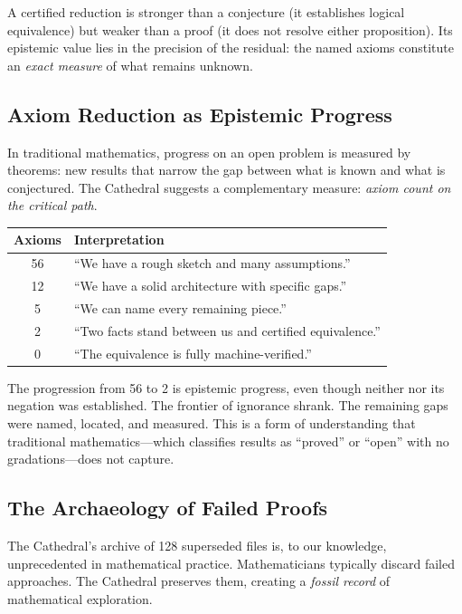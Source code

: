 \documentclass[11pt,a4paper]{article}
\begin{document}
A certified reduction is stronger than a conjecture (it establishes
logical equivalence) but weaker than a proof (it does not resolve
either proposition). Its epistemic value lies in the precision of
the residual: the named axioms constitute an \emph{exact measure}
of what remains unknown.

\subsection{Axiom Reduction as Epistemic Progress}

In traditional mathematics, progress on an open problem is measured
by theorems: new results that narrow the gap between what is known
and what is conjectured. The Cathedral suggests a complementary
measure: \emph{axiom count on the critical path}.

\begin{center}
\begin{tabular}{@{}cl@{}}
\toprule
\textbf{Axioms} & \textbf{Interpretation} \\
\midrule
56 & ``We have a rough sketch and many assumptions.'' \\
12 & ``We have a solid architecture with specific gaps.'' \\
5 & ``We can name every remaining piece.'' \\
2 & ``Two facts stand between us and certified equivalence.'' \\
0 & ``The equivalence is fully machine-verified.'' \\
\bottomrule
\end{tabular}
\end{center}

The progression from 56 to 2 is epistemic progress, even though
neither \RH{} nor its negation was established. The frontier of
ignorance shrank. The remaining gaps were named, located, and
measured. This is a form of understanding that traditional
mathematics---which classifies results as ``proved'' or ``open''
with no gradations---does not capture.

\subsection{The Archaeology of Failed Proofs}

The Cathedral's archive of 128 superseded files is, to our knowledge,
unprecedented in mathematical practice. Mathematicians typically
discard failed approaches. The Cathedral preserves them, creating a
\emph{fossil record} of mathematical exploration.
\end{document}
